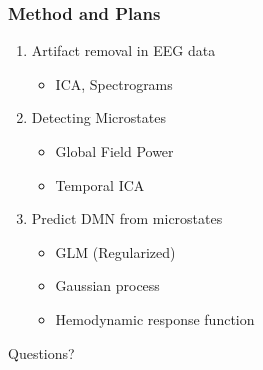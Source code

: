 \documentclass[9pt,presentation]{beamer}   %
\begin{document}
\begin{frame}[t]
\frametitle{Method and Plans}

\begin{enumerate}
\item Artifact removal in EEG data
\vspace{0.2cm}
\begin{itemize}
\item ICA, Spectrograms
\end{itemize}
\vspace{0.2cm}
\item Detecting Microstates
\vspace{0.3cm}
\begin{itemize}
\item Global Field Power
\vspace{0.3cm}
\item Temporal ICA
\end{itemize}

\vspace{0.3cm}
\item Predict DMN from microstates
\vspace{0.2cm}
\begin{itemize}
\item GLM (Regularized)
\vspace{0.3cm}
\item Gaussian process
\vspace{0.3cm}
\item Hemodynamic response function
\end{itemize}
\end{enumerate}

\end{frame}



\begin{frame}[plain,c]

\begin{center}
\Huge Questions?
\end{center}

\end{frame}

%	
%
%






\nocite{Yuan20122062}
\nocite{Raichle}
\nocite{lehmann1980reference}

\end{document}

